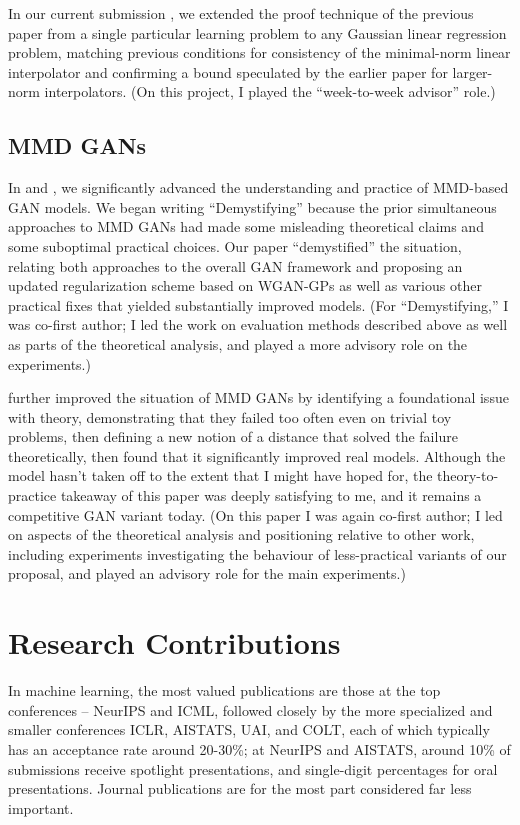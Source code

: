 \documentclass[12pt]{article}
\newcommand{\bibeqcon}{{\footnotemark[1]}}
\begin{document}
In our current submission \cite{koehler:gaussian-interpolators}, we extended the proof technique of the previous paper from a single particular learning problem to any Gaussian linear regression problem, matching previous conditions for consistency of the minimal-norm linear interpolator and confirming a bound speculated by the earlier paper for larger-norm interpolators. (On this project, I played the ``week-to-week advisor'' role.)


\subsection{MMD GANs}

In \cite{binkowski:mmd-gans} and \cite{arbel:smmd}, we significantly advanced the understanding and practice of MMD-based GAN models. We began writing ``Demystifying'' because the prior simultaneous approaches to MMD GANs had made some misleading theoretical claims and some suboptimal practical choices. Our paper ``demystified'' the situation, relating both approaches to the overall GAN framework and proposing an updated regularization scheme based on WGAN-GPs as well as various other practical fixes that yielded substantially improved models.
(For ``Demystifying,'' I was co-first author; I led the work on evaluation methods described above as well as parts of the theoretical analysis, and played a more advisory role on the experiments.)

\cite{arbel:smmd} further improved the situation of MMD GANs by identifying a foundational issue with theory, demonstrating that they failed too often even on trivial toy problems, then defining a new notion of a distance that solved the failure theoretically, then found that it significantly improved real models. Although the model hasn't taken off to the extent that I might have hoped for, the theory-to-practice takeaway of this paper was deeply satisfying to me, and it remains a competitive GAN variant today. (On this paper I was again co-first author; I led on aspects of the theoretical analysis and positioning relative to other work, including experiments investigating the behaviour of less-practical variants of our proposal, and played an advisory role for the main experiments.)



\section{Research Contributions}
\renewcommand{\bibeqcon}{{\footnotemark[1]}}
\renewcommand{\thefootnote}{\fnsymbol{footnote}}  %
In machine learning, the most valued publications are those at the top conferences -- NeurIPS and ICML, followed closely by the more specialized and smaller conferences ICLR, AISTATS, UAI, and COLT, each of which typically has an acceptance rate around 20-30\%; at NeurIPS and AISTATS, around 10\% of submissions receive spotlight presentations, and single-digit percentages for oral presentations.
Journal publications are for the most part considered far less important.
\nocite{*}
\end{document}
